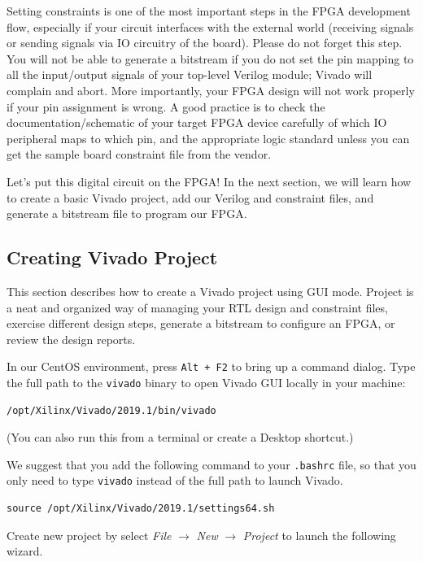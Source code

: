 \documentclass[11pt]{article}
\begin{document}
Setting constraints is one of the most important steps in the FPGA development flow, especially if your circuit interfaces with the external world (receiving signals or sending signals via IO circuitry of the board). Please do not forget this step. You will not be able to generate a bitstream if you do not set the pin mapping to all the input/output signals of your top-level Verilog module; Vivado will complain and abort. More importantly, your FPGA design will not work properly if your pin assignment is wrong. A good practice is to check the documentation/schematic of your target FPGA device carefully of which IO peripheral maps to which pin, and the appropriate logic standard unless you can get the sample board constraint file from the vendor.

Let's put this digital circuit on the FPGA! In the next section, we will learn how to create a basic Vivado project, add our Verilog and constraint files, and generate a bitstream file to program our FPGA.

\subsection{Creating Vivado Project}

This section describes how to create a Vivado project using GUI mode. Project is a neat and organized way of managing your RTL design and constraint files, exercise different design steps, generate a bitstream to configure an FPGA, or review the design reports.

In our CentOS environment, press \texttt{Alt + F2} to bring up a command dialog. Type the full path to the \texttt{vivado} binary to open Vivado GUI locally in your machine:

\begin{verbatim}
/opt/Xilinx/Vivado/2019.1/bin/vivado
\end{verbatim}

(You can also run this from a terminal or create a Desktop shortcut.)

We suggest that you add the following command to your \texttt{.bashrc} file, so that you only need to type \texttt{vivado} instead of the full path to launch Vivado.

\begin{verbatim}
source /opt/Xilinx/Vivado/2019.1/settings64.sh
\end{verbatim}

Create new project by select \emph{File} $\rightarrow$ \emph{New} $\rightarrow$ \emph{Project} to launch the following wizard.
\end{document}
